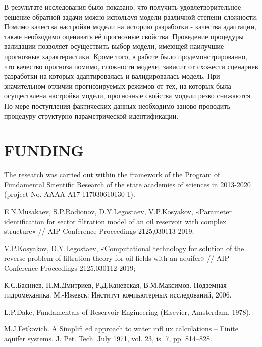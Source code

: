 \documentclass{article}
\begin{document}
В результате исследования было показано, что получить удовлетворительное решение обратной задачи можно используя модели различной степени сложности. Помимо качества настройки модели на историю разработки - качества адаптации, также необходимо оценивать её прогнозные свойства. Проведение процедуры валидации позволяет осуществить выбор модели, имеющей наилучшие прогнозные характеристики. Кроме того, в работе было продемонстрированно, что качество прогноза помимо, сложности модели, зависит от схожести сценариев разработки на которых адаптировалась и валидировалась модель. При  значительном отличии прогнозируемых режимов от тех, на которых была осуществлена настройка модели, прогнозные свойства модели резко снижаются. По мере поступления фактических данных необходимо заново проводить процедуру структурно-параметрической идентификации.

\section{FUNDING}
The research was carried out within the framework of the Program of Fundamental Scientific Research of the state academies of sciences in 2013-2020 (project No. AAAA-A17-117030610130-1).

%
%
\begin{thebibliography}{99}
 E.N.Musakaev, S.P.Rodionov, D.Y.Legostaev, V.P.Kosyakov,  «Parameter identification for sector filtration model of an oil reservoir with complex structure» // AIP Conference Proceedings 2125,030113 2019;

 V.P.Kosyakov, D.Y.Legostaev,  «Computational technology for solution of the reverse problem of filtration theory for oil fields with an aquifer» // AIP Conference Proceedings 2125,030112 2019;

 К.С.Басниев, Н.М.Дмитриев, Р.Д.Каневская, В.М.Максимов. Подземная гидромеханика.  М.-Ижевск: Институт компьютерных исследований, 2006. 

 L.P.Dake, Fundamentals of Reservoir Engineering (Elsevier, Amsterdam, 1978).

 M.J.Fetkovich. A Simplifi ed approach to water infl ux calculations – Finite aquifer systems. J. Pet. Tech. July 1971, vol. 23, is. 7, pp. 814–828.


\end{thebibliography}
\end{document}
